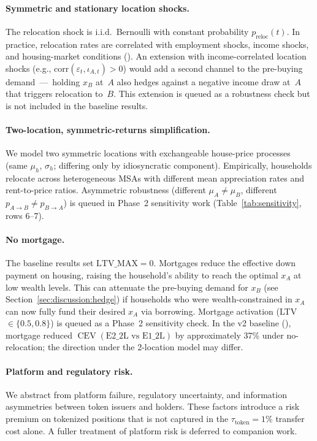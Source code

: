 \paragraph{Symmetric and stationary location shocks.}
The relocation shock is i.i.d.\ Bernoulli with constant probability
$p_{\text{reloc}}(t)$.
In practice, relocation rates are correlated with employment shocks,
income shocks, and housing-market conditions (\citealt{PSID}).
An extension with income-correlated location shocks (e.g.,
$\text{corr}(\varepsilon_t, \iota_{A,t}) > 0$) would add a second
channel to the pre-buying demand~---~holding $x_B$ at~$A$ also hedges
against a negative income draw at~$A$ that triggers relocation to~$B$.
This extension is queued as a robustness check but is not included in
the baseline results.

\paragraph{Two-location, symmetric-returns simplification.}
We model two symmetric locations with exchangeable house-price processes
(same $\mu_h$, $\sigma_h$; differing only by idiosyncratic component).
Empirically, households relocate across heterogeneous MSAs with different
mean appreciation rates and rent-to-price ratios.
Asymmetric robustness (different $\mu_A \neq \mu_B$, different
$p_{A \to B} \neq p_{B \to A}$) is queued in Phase~2 sensitivity work
(Table~\ref{tab:sensitivity}, rows 6--7).

\paragraph{No mortgage.}
The baseline results set $\text{LTV\_MAX} = 0$.
Mortgages reduce the effective down payment on housing, raising the
household's ability to reach the optimal $x_A$ at low wealth levels.
This can attenuate the pre-buying demand for $x_B$ (see
Section~\ref{sec:discussion:hedge}) if households who were
wealth-constrained in $x_A$ can now fully fund their desired $x_A$
via borrowing.
Mortgage activation (LTV $\in \{0.5, 0.8\}$) is queued as a Phase~2
sensitivity check.
In the v2 baseline (\citealt{research_log_2026_05_01_mortgage}),
mortgage reduced $\operatorname{CEV}(\text{E2\_2L vs E1\_2L})$ by
approximately 37\% under no-relocation; the direction under the
2-location model may differ.

\paragraph{Platform and regulatory risk.}
We abstract from platform failure, regulatory uncertainty, and
information asymmetries between token issuers and holders.
These factors introduce a risk premium on tokenized positions that
is not captured in the $\tau_{\text{token}} = 1\%$ transfer cost
alone.
A fuller treatment of platform risk is deferred to companion work.

